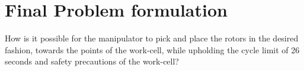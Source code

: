 \chapter{Final Problem formulation} \label{ch:finalprob}
 
 
 How is it possible for the manipulator to pick and place the rotors in the desired fashion, towards the points of the work-cell, while upholding the cycle limit of 26 seconds and safety precautions of the work-cell? 
 
 
 